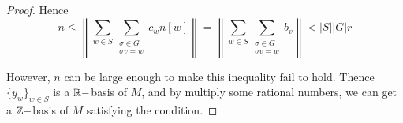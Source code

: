 \begin{proof}
      Hence
      \begin{equation*}
        n\leqslant\left\|\sum_{w\in S} \sum_{\substack{
                                          \sigma\in G\\
                                          \sigma v=w}} c_wn[w]\right\|
        =\left\|\sum_{w\in S} \sum_{\substack{
                                          \sigma\in G\\
                                          \sigma v=w}} b_v\right\|<|S||G|r
      \end{equation*}

      However, $n$ can be large enough to make this inequality fail to hold. Thence $\{y_w\}_{w\in S}$ is a ${\mathbb R}-$basis of $M$, and by multiply some rational numbers, we can get a ${\mathbb Z}-$basis of $M$ satisfying the condition.
    \end{proof}

